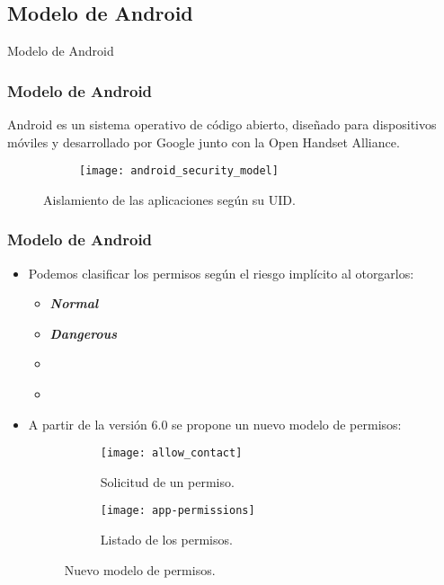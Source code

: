 \subsection{Modelo de Android}
\begin{frame}
 \begin{center}
  \LARGE Modelo de Android
 \end{center}
\end{frame}
\begin{frame}
 \frametitle{Modelo de Android}
 {Android es un sistema operativo de código abierto, diseñado para dispositivos móviles y desarrollado por Google junto con la Open Handset Alliance.}\pause
 \begin{figure}[H]
    \centering
    \begin{subfigure}{0.75\linewidth}
		\texttt{[image: android\_security\_model]}
	    \label{fig:ch01:sandbox}
    \end{subfigure}
    \caption{Aislamiento de las aplicaciones según su UID.}
 \end{figure}
\end{frame}
\begin{frame}
 \frametitle{Modelo de Android}
 \begin{small}
 \begin{itemize}
     \item Podemos clasificar los permisos según el riesgo implícito al otorgarlos:
     \begin{multicols}{2}
     \begin{itemize}[<+->]\small
      \item \emph{\textbf<5->{Normal}}
      \item \emph{\textbf<5->{Dangerous}}
      \item \emph{}
      \item \emph{}
     \end{itemize}
     \end{multicols}\pause
     \item A partir de la versión 6.0 se propone un nuevo modelo de permisos:\pause
         \begin{figure}[btp]
            \begin{subfigure}{0.4\linewidth}
            \centering
                \texttt{[image: allow\_contact]}
                \caption{Solicitud de un permiso.}
            \end{subfigure}
        \begin{subfigure}{0.4\linewidth}\pause
        \centering
            \texttt{[image: app-permissions]}
            \caption{Listado de los permisos.}
    	\end{subfigure}
    	\caption{Nuevo modelo de permisos.}
        \end{figure}
 \end{itemize}
  \end{small}
\end{frame}

